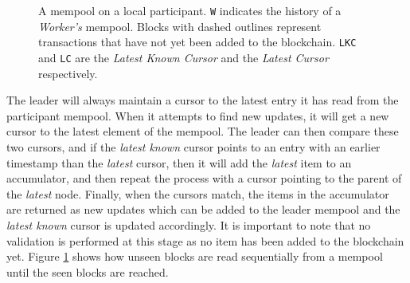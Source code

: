 \documentclass[12pt,a4paper,twoside,openright]{report}
\begin{document}
			\begin{figure}
				\begin{center}
					\end{center}
				\caption{A mempool on a local participant. \texttt{W} indicates the history of a \textit{Worker's} mempool. Blocks with dashed outlines represent transactions that have not yet been added to the blockchain. \texttt{LKC} and \texttt{LC} are the \textit{Latest Known Cursor} and the \textit{Latest Cursor} respectively.}
				\label{fig:readlocalpartudpates}
			\end{figure}

			The leader will always maintain a cursor to the latest entry it has read from the participant mempool.
			When it attempts to find new updates, it will get a new cursor to the latest element of the mempool.
			The leader can then compare these two cursors, and if the \textit{latest known} cursor points to an entry with an earlier timestamp than the \textit{latest} cursor, then it will add the \textit{latest} item to an accumulator, and then repeat the process with a cursor pointing to the parent of the \textit{latest} node. 
			Finally, when the cursors match, the items in the accumulator are returned as new updates which can be added to the leader mempool and the \textit{latest known} cursor is updated accordingly.
			It is important to note that no validation is performed at this stage as no item has been added to the blockchain yet.
			Figure \ref{fig:readlocalpartudpates} shows how unseen blocks are read sequentially from a mempool until the seen blocks are reached.
	
\end{document}
